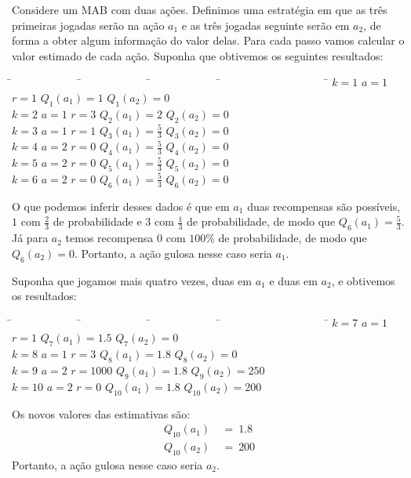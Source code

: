 \documentclass{article}
\begin{document}
            Considere um MAB com duas ações. Definimos uma estratégia em que as três primeiras jogadas serão na ação $a_1$ e as três jogadas seguinte serão em $a_2$, de forma a obter algum informação do valor delas. Para cada passo vamos calcular o valor estimado de cada ação. Suponha que obtivemos os seguintes resultados:
            \begin{tabbing}
                \hspace{4.0cm}\=~~~~~~~~~~~~ \=~~~~~~~~~~~~ \=~~~~~~~~~~~~ \=~~~~~~~~~~~~~~~~~~~ \= \kill
                \> $k = 1$   \> $a = 1$   \> $r = 1$   \> $Q_1(a_1) = 1$           \> $Q_1(a_2) = 0$\\
                \> $k = 2$   \> $a = 1$   \> $r = 3$   \> $Q_2(a_1) = 2$           \> $Q_2(a_2) = 0$\\
                \> $k = 3$   \> $a = 1$   \> $r = 1$   \> $Q_3(a_1) = \frac{5}{3}$ \> $Q_3(a_2) = 0$\\
                \> $k = 4$   \> $a = 2$   \> $r = 0$   \> $Q_4(a_1) = \frac{5}{3}$ \> $Q_4(a_2) = 0$\\
                \> $k = 5$   \> $a = 2$   \> $r = 0$   \> $Q_5(a_1) = \frac{5}{3}$ \> $Q_5(a_2) = 0$\\
                \> $k = 6$   \> $a = 2$   \> $r = 0$   \> $Q_6(a_1) = \frac{5}{3}$ \> $Q_6(a_2) = 0$
            \end{tabbing}
            O que podemos inferir desses dados é que em $a_1$ duas recompensas são possíveis, $1$ com $\frac{2}{3}$ de probabilidade e $3$ com $\frac{1}{3}$ de probabilidade, de modo que $Q_6(a_1) = \frac{5}{3}$. Já para $a_2$ temos recompensa $0$ com $100\%$ de probabilidade, de modo que $Q_6(a_2) = 0$. Portanto, a ação gulosa nesse caso seria $a_1$.
            
            Suponha que jogamos mais quatro vezes, duas em $a_1$ e duas em $a_2$, e obtivemos os resultados:
            \begin{tabbing}
                \hspace{4.0cm}\=~~~~~~~~~~~~ \=~~~~~~~~~~~~ \=~~~~~~~~~~~~ \=~~~~~~~~~~~~~~~~~~~ \= \kill
                \> $k = 7$   \> $a = 1$   \> $r = 1$   \> $Q_7(a_1) = 1.5$  \> $Q_7(a_2) = 0$\\
                \> $k = 8$   \> $a = 1$   \> $r = 3$   \> $Q_8(a_1) = 1.8$  \> $Q_8(a_2) = 0$\\
                \> $k = 9$   \> $a = 2$   \> $r = 1000$\> $Q_9(a_1) = 1.8$  \> $Q_9(a_2) = 250$\\
                \> $k = 10$  \> $a = 2$   \> $r = 0$   \> $Q_{10}(a_1) = 1.8$ \> $Q_{10}(a_2) = 200$
            \end{tabbing}
            Os novos valores das estimativas são:
            \begin{equation*}
            \begin{split}
                Q_{10}(a_1) & \ = \ 1.8\\
                Q_{10}(a_2) & \ = \ 200
            \end{split}
            \end{equation*}
            Portanto, a ação gulosa nesse caso seria $a_2$. 
            
\end{document}
